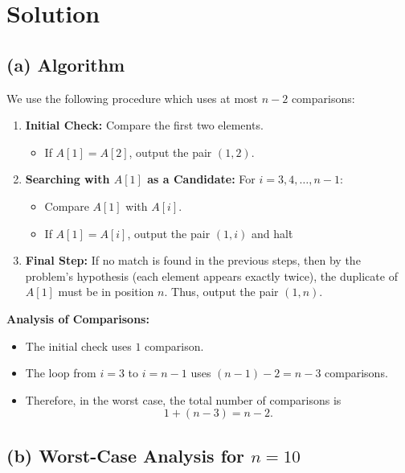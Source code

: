 \documentclass[11pt]{article}
\begin{document}
    \section*{Solution}    
    \subsection*{(a) Algorithm}
    
    We use the following procedure which uses at most \( n-2 \) comparisons:
    
    \begin{enumerate}
        \item \textbf{Initial Check:} Compare the first two elements.
        \begin{itemize}
            \item If \( A[1] = A[2] \), output the pair \((1,2)\).
        \end{itemize}
        
        \item \textbf{Searching with \( A[1] \) as a Candidate:}  
        For \( i = 3, 4, \dots, n-1 \):
        \begin{itemize}
            \item Compare \( A[1] \) with \( A[i] \).
            \item If \( A[1] = A[i] \), output the pair \((1,i)\) and halt\.
        \end{itemize}
        
        \item \textbf{Final Step:}  
        If no match is found in the previous steps, then by the problem's hypothesis (each element appears exactly twice), the duplicate of \( A[1] \) must be in position \( n \). Thus, output the pair \((1,n)\).
    \end{enumerate}
    
    \textbf{Analysis of Comparisons:}
    
    \begin{itemize}
        \item The initial check uses \( 1 \) comparison.
        \item The loop from \( i = 3 \) to \( i = n-1 \) uses \( (n-1) - 2 = n-3 \) comparisons.
        \item Therefore, in the worst case, the total number of comparisons is 
        \[
        1 + (n-3) = n-2.
        \]
    \end{itemize}
    
    \subsection*{(b) Worst-Case Analysis for \( n = 10 \)}
    
\end{document}
